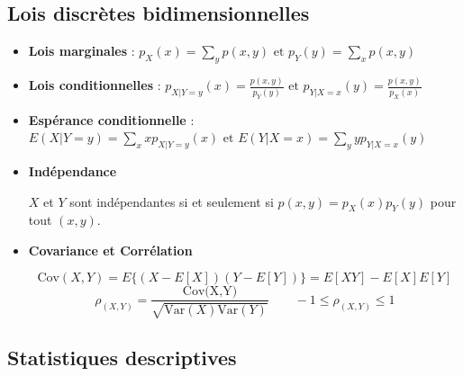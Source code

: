 \documentclass[12pt,french]{article}
\begin{document}
\subsection*{Lois discrètes bidimensionnelles}

\begin{itemize}
\item {\bf Lois marginales} : $ p_X(x)=  \sum_y p(x,y) \mbox{ et }
p_Y(y) = \sum_x p(x,y) $

\item {\bf Lois conditionnelles} : $\displaystyle p_{X | Y=y}(x) =  \frac{p(x,y)}{p_Y(y)} \mbox{ et }  p_{Y | X=x}(y)=  \frac{p(x,y)}{p_X(x)}$

\item {\bf Espérance conditionnelle} : $E(X|Y=y) = \sum_x x p_{X|Y=y}(x) \mbox{ et } E(Y|X=x) = \sum_y y p_{Y|X=x}(y) $

\item {\bf Indépendance}

\noindent $X$ et $Y$ sont indépendantes si et seulement si $p(x,y)
= p_X(x) p_Y(y)$ pour tout $(x,y)$.
\item {\bf Covariance et Corrélation}

$$\mbox{Cov}(X,Y) = E\{(X-E[X])(Y-E[Y])\} = E[XY] - E[X]E[Y]$$
$${\rho}_{(X,Y)} =
\frac{\mbox{Cov(X,Y)}}{\sqrt{\mbox{Var}(X)\mbox{Var}(Y)}} \quad
\quad -1 \le {\rho}_{(X,Y)} \le 1 $$

\end{itemize}

\subsection*{Statistiques descriptives}
\end{document}
